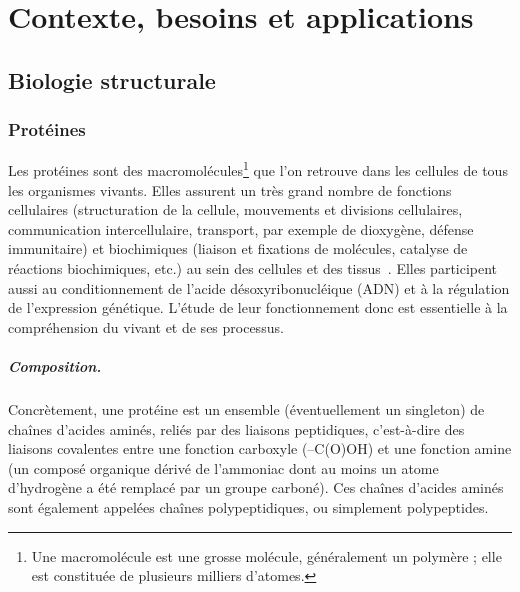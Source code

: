 
\chapter[Contexte/Besoin/Applications]{Contexte, besoins et applications}

\setcounter{minitocdepth}{4}
\minitoc
\label{chap1}
\cleardoublepage

	\section{Biologie structurale}
	\subsection{Protéines}
	Les protéines sont des macromolécules\footnote{Une macromolécule est une \og grosse \fg{} molécule, généralement un polymère ; elle est constituée de plusieurs milliers d'atomes.} que l'on retrouve dans les cellules de tous les organismes vivants. Elles assurent un très grand nombre de fonctions cellulaires (structuration de la cellule, mouvements et divisions cellulaires, communication intercellulaire, transport, par exemple de dioxygène, défense immunitaire) et biochimiques (liaison et fixations de molécules, catalyse de réactions biochimiques, etc.) au sein des cellules et des tissus~\cite{lodish2004molecular}. Elles participent aussi au conditionnement de l'acide désoxyribonucléique (ADN) et à la régulation de l'expression génétique. L'étude de leur fonctionnement donc est essentielle à la compréhension du vivant et de ses processus.
	
	\paragraph{Composition.}
	Concrètement, une protéine est un ensemble (éventuellement un singleton) de chaînes d'acides aminés, reliés par des liaisons peptidiques, c'est-à-dire des liaisons covalentes entre une fonction carboxyle (–C(O)OH) et une fonction amine (un composé organique dérivé de l'ammoniac dont au moins un atome d'hydrogène a été remplacé par un groupe carboné). Ces chaînes d'acides aminés sont également appelées chaînes polypeptidiques, ou simplement polypeptides.
	
